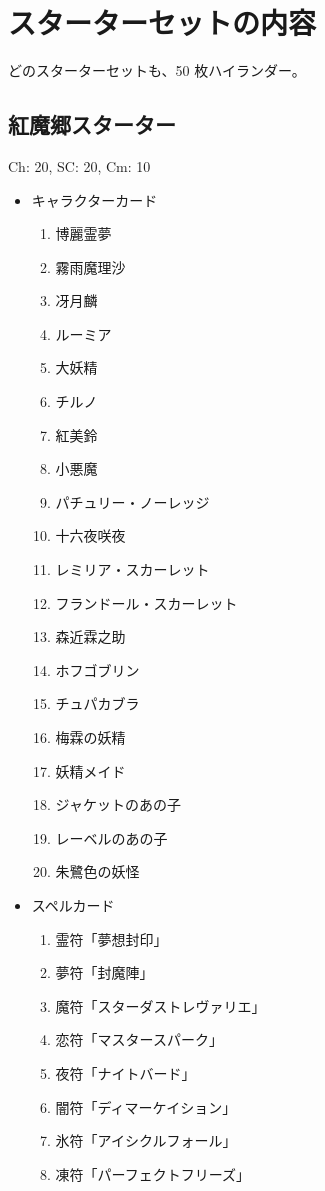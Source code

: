 \documentclass[line_length=22zw,number_of_lines=45,twocolumn]{jlreq}
\begin{document}
\section{スターターセットの内容}
どのスターターセットも、50 枚ハイランダー。
\clearpage\small
\subsection{紅魔郷スターター}
Ch: 20, SC: 20, Cm: 10
\begin{itemize}
	\item キャラクターカード
		\begin{enumerate}
			\item 博麗霊夢
			\item 霧雨魔理沙
			\item 冴月麟
			\item ルーミア
			\item 大妖精
			\item チルノ
			\item 紅美鈴
			\item 小悪魔
			\item パチュリー・ノーレッジ
			\item 十六夜咲夜
			\item レミリア・スカーレット
			\item フランドール・スカーレット
			\item 森近霖之助
			\item ホフゴブリン
			\item チュパカブラ
			\item 梅霖の妖精
			\item 妖精メイド
			\item ジャケットのあの子
			\item レーベルのあの子
			\item 朱鷺色の妖怪
		\end{enumerate}
	\item スペルカード
		\begin{enumerate}
			\item 霊符「夢想封印」
			\item 夢符「封魔陣」
			\item 魔符「スターダストレヴァリエ」
			\item 恋符「マスタースパーク」
			\item 夜符「ナイトバード」
			\item 闇符「ディマーケイション」
			\item 氷符「アイシクルフォール」
			\item 凍符「パーフェクトフリーズ」

\end{enumerate}
\end{itemize}
\end{document}
